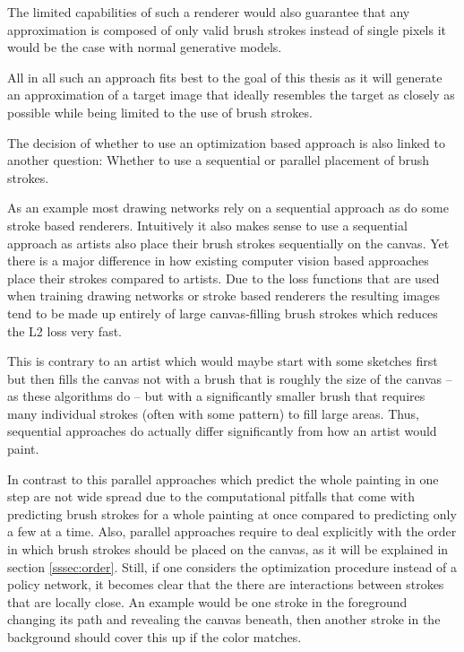 The limited capabilities of such a renderer would also guarantee that any approximation
is composed of only valid brush strokes instead of single pixels it would be the
case with normal generative models.

All in all such an approach fits best to the goal of this thesis as it will generate
an approximation of a target image that ideally resembles the target as closely as
possible while being limited to the use of brush strokes.



The decision of whether to use an optimization based approach is also linked to
another question: Whether to use a sequential or parallel placement of brush strokes.

As an example most drawing networks rely on a sequential approach as do some stroke
based renderers.
Intuitively it also makes sense to use a sequential approach as artists also place
their brush strokes sequentially on the canvas.
Yet there is a major difference in how existing computer vision based approaches
place their strokes compared to artists.
Due to the loss functions that are used when training drawing networks or stroke based
renderers the resulting images tend to be made up entirely of large canvas-filling
brush strokes which reduces the L2 loss very fast.

This is contrary to an artist which would maybe start with some sketches first but
then fills the canvas not with a brush that is roughly the size of the canvas -- as these
algorithms do -- but with a significantly smaller brush that requires many individual
strokes (often with some pattern) to fill large areas.
Thus, sequential approaches do actually differ significantly from how an artist would
paint.

In contrast to this parallel approaches which predict the whole painting in one step
are not wide spread due to the computational pitfalls that come with predicting
brush strokes for a whole painting at once compared to predicting only a few at a time.
Also, parallel approaches require to deal explicitly with the order in which brush
strokes should be placed on the canvas, as it will be explained in section \ref{sssec:order}.
Still, if one considers the optimization procedure instead of a policy network,
it becomes clear that the there are interactions between strokes that are locally
close.
An example would be one stroke in the foreground changing its path and revealing
the canvas beneath, then another stroke in the background should cover this up if
the color matches.

